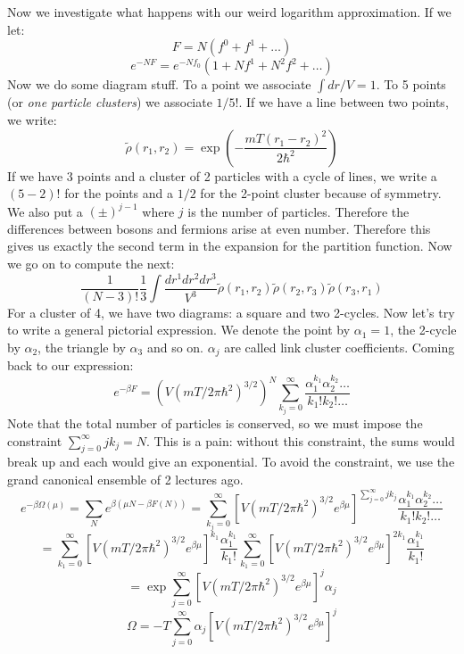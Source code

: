 \documentclass[12 pt]{article}
\begin{document}
\\
\\
Now we investigate what happens with our weird logarithm approximation. If we let:
\[   F = N (f^0 + f^1 + \dots)     \]
\[  e^{-NF} = e^{-Nf_0} \left( 1 + Nf^1 + N^2 f^2 + \dots  \right)  \]
Now we do some diagram stuff. To a point we associate $\int dr/V = 1$. To 5 points (or \emph{one particle clusters}) we associate $1/5!$. If we have a line between two points, we write:
\[            \tilde \rho(r_1, r_2) = \exp\left( - \frac{mT (r_1 - r_2)^2}{2\hbar^2}  \right)    \]
If we have 3 points and a cluster of 2 particles with a cycle of lines, we write a $(5-2)!$ for the points and a $1/2$ for the 2-point cluster because of symmetry. We also put a $(\pm)^{j-1}$ where $j$ is the number of particles. Therefore the differences between bosons and fermions arise at even number. Therefore this gives us exactly the second term in the expansion for the partition function. Now we go on to compute the next:
\[     \frac{1}{(N-3)!} \frac{1}{3} \int \frac{dr^1 dr^2 dr^3}{V^3} \tilde \rho(r_1, r_2) \tilde \rho(r_2, r_3) \tilde \rho(r_3, r_1)   \]
For a cluster of 4, we have two diagrams: a square and two 2-cycles. Now let's try to write a general pictorial expression. We denote the point by $\alpha_1 = 1$, the 2-cycle by $\alpha_2$, the triangle by $\alpha_3$ and so on. $\alpha_j$ are called link cluster coefficients. Coming back to our expression:
\[    e^{-\beta F} =   \left(  V (mT/2\pi \hbar^2)^{3/2} \right)^N \sum_{k_j = 0}^{\infty} \frac{\alpha_1^{k_1} \alpha_2^{k_2} \dots}{k_1! k_2! \dots}  \]
Note that the total number of particles is conserved, so we must impose the constraint $\sum_{j=0}^{\infty} j k_j = N$. This is a pain: without this constraint, the sums would break up and each would give an exponential. To avoid the constraint, we use the grand canonical ensemble of 2 lectures ago.
\[     e^{-\beta \Omega(\mu)} = \sum_N e^{\beta(\mu N - \beta F(N))}   = \sum_{k_j = 0}^{\infty} \left[ V (mT/2\pi\hbar^2)^{3/2} e^{\beta \mu}  \right]   ^{\sum_{j=0}^{\infty} j k_j}  \frac{\alpha_1^{k_1} \alpha_2^{k_2} \dots}{k_1! k_2! \dots} \]
\[      =  \sum_{k_1 = 0}^{\infty}   \left[ V (mT/2\pi\hbar^2)^{3/2} e^{\beta \mu} \right]^{k_1} \frac{\alpha_1^{k_1}}{k_1!}  \sum_{k_1 = 0}^{\infty}   \left[ V (mT/2\pi\hbar^2)^{3/2} e^{\beta \mu} \right]^{2k_1} \frac{\alpha_1^{k_1}}{k_1!}  \]
\[     = \exp  \sum_{j=0}^{\infty}\left[ V (mT/2\pi\hbar^2)^{3/2} e^{\beta \mu}  \right] ^j \alpha_j    \]
\[    \Omega = -T   \sum_{j=0}^{\infty} \alpha_j \left[ V (mT/2\pi\hbar^2)^{3/2} e^{\beta \mu}  \right] ^j    \]
\end{document}
